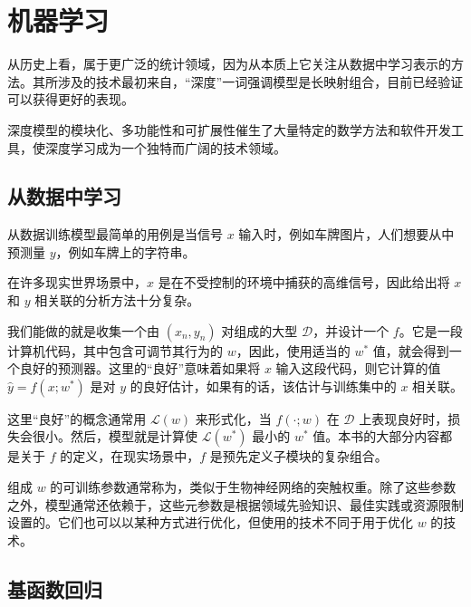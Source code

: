 \chapter{机器学习}

从历史上看，属于更广泛的统计领域，因为从本质上它关注从数据中学习表示的方法。其所涉及的技术最初来自，``深度''一词强调模型是长映射组合，目前已经验证可以获得更好的表现。

深度模型的模块化、多功能性和可扩展性催生了大量特定的数学方法和软件开发工具，使深度学习成为一个独特而广阔的技术领域。

\section{从数据中学习}\label{sec1.1}

从数据训练模型最简单的用例是当信号 $x$ 输入时，例如车牌图片，人们想要从中预测量 $y$，例如车牌上的字符串。

在许多现实世界场景中，$x$ 是在不受控制的环境中捕获的高维信号，因此给出将 $x$ 和 $y$ 相关联的分析方法十分复杂。

我们能做的就是收集一个由 $(x_n, y_n)$ 对组成的大型 $\mathcal{D}$，并设计一个 $f$。它是一段计算机代码，其中包含可调节其行为的 $w$，因此，使用适当的 $w^*$ 值，就会得到一个良好的预测器。这里的``良好''意味着如果将 $x$ 输入这段代码，则它计算的值 $\hat{y}= f(x;w^*)$ 是对 $y$ 的良好估计，如果有的话，该估计与训练集中的 $x$ 相关联。

这里``良好''的概念通常用 $\mathcal{L}(w)$ 来形式化，当 $f(\cdot;w)$ 在 $\mathcal{D}$ 上表现良好时，损失会很小。然后，模型就是计算使 $\mathcal{L}(w^*)$ 最小的 $w^*$ 值。本书的大部分内容都是关于 $f$ 的定义，在现实场景中，$f$ 是预先定义子模块的复杂组合。

组成 $w$ 的可训练参数通常称为，类似于生物神经网络的突触权重。除了这些参数之外，模型通常还依赖于，这些元参数是根据领域先验知识、最佳实践或资源限制设置的。它们也可以以某种方式进行优化，但使用的技术不同于用于优化 $w$ 的技术。

\section{基函数回归}\label{sec1.2}

